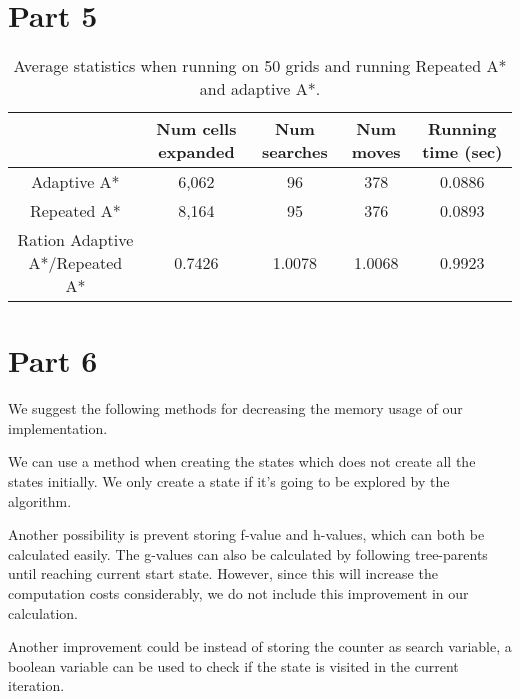 \documentclass{article}
\begin{document}
\section*{Part 5}

\begin{table}[h]
  \begin{center}
    \begin{tabular}{|*{5}{c|}}
      \cline{2-5}
      \multicolumn{1}{c|}{} & Num cells expanded & Num searches & Num moves & Running time (sec) \\ \hline
      Adaptive A* & 6,062 & 96 & 378 & 0.0886\\ \hline 
      Repeated A*  & 8,164  & 95 & 376 & 0.0893 \\ \hline \hline
      Ration Adaptive A*/Repeated A* & 0.7426 & 1.0078 & 1.0068 & 0.9923 \\ \hline
    \end{tabular}
  \end{center}
  \caption{Average statistics when running on 50 grids and running Repeated A* and adaptive A*.}
\end{table}

\section*{Part 6}
We suggest the following methods for decreasing the memory usage of our implementation. 

We can use a method when creating the states which does not  create all the states initially. We only create a state if it's going to be explored by the algorithm.

Another possibility is prevent storing f-value and h-values, which can both be calculated easily. The g-values can also be calculated by following tree-parents until reaching current start state. However, since this will increase the computation costs considerably, we do not include this improvement in our calculation. 

 Another improvement could be instead of storing the counter as search variable, a boolean variable can be used to check if the state is visited in the current iteration.
\end{document}
